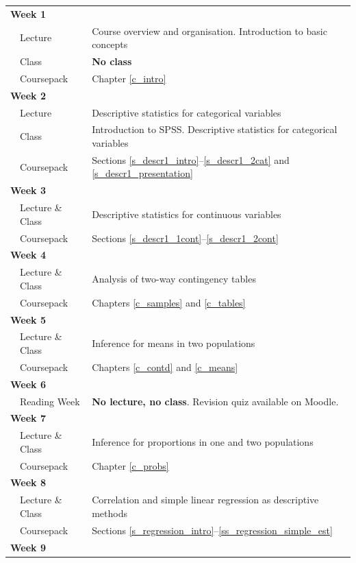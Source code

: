 \begin{tabular}{lll}
\multicolumn{2}{l}{\textbf{Week 1}} & \\
& Lecture  & Course overview and organisation. Introduction to basic
concepts\\
& Class & \textbf{No class}\\
& Coursepack & Chapter \ref{c_intro}  \\
\multicolumn{2}{l}{\textbf{Week 2}} & \\
& Lecture & Descriptive statistics for categorical variables  \\
& Class & Introduction to SPSS. Descriptive statistics for categorical variables\\
& Coursepack &
Sections
\ref{s_descr1_intro}--\ref{s_descr1_2cat} and
\ref{s_descr1_presentation}\\
\multicolumn{2}{l}{\textbf{Week 3}} & \\
& Lecture \& Class & Descriptive statistics for continuous variables \\
& Coursepack & Sections
\ref{s_descr1_1cont}--\ref{s_descr1_2cont}
\\
\multicolumn{2}{l}{\textbf{Week 4}} & \\
& Lecture  \& Class & Analysis of two-way contingency tables \\
& Coursepack & Chapters \ref{c_samples} and \ref{c_tables}
\\
\multicolumn{2}{l}{\textbf{Week 5}} & \\
& Lecture  \& Class& Inference for means in two populations \\
& Coursepack & Chapters \ref{c_contd} and \ref{c_means} \\
\multicolumn{2}{l}{\textbf{Week 6}} & \\
&Reading Week & \textbf{No lecture, no class}. Revision quiz  available on Moodle. \\
\multicolumn{2}{l}{\textbf{Week 7}} & \\
& Lecture  \& Class & Inference for proportions in one and two populations\\
& Coursepack & Chapter \ref{c_probs} \\
\multicolumn{2}{l}{\textbf{Week 8}} & \\
& Lecture  \& Class & Correlation and simple linear regression as descriptive methods \\
& Coursepack & Sections \ref{s_regression_intro}--\ref{ss_regression_simple_est} \\
\multicolumn{2}{l}{\textbf{Week 9}} & \\

\end{tabular}
